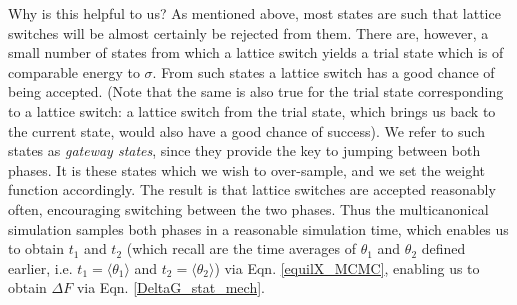 \documentclass{report}
\begin{document}
Why is this helpful to us? As mentioned above, most states are such that lattice switches will be almost certainly be rejected from them. There 
are, however, a small number of states from which a lattice switch yields a trial state which is of comparable energy to $\sigma$. From such 
states a lattice switch has a good chance of being accepted. (Note that the same is also true for the trial state corresponding to a lattice switch:
a lattice switch from the trial state, which brings us back to the current state, would also have a good chance of success). We refer to 
such states as \emph{gateway states}, since they provide the key to jumping between both phases. It is these states which we wish to over-sample,
and we set the weight function accordingly. The result is that lattice switches are accepted reasonably often, encouraging switching between the 
two phases. Thus the multicanonical simulation samples both phases in a reasonable simulation time, which enables us to obtain 
$t_1$ and $t_2$ (which recall are the time averages of $\theta_1$ and $\theta_2$ defined earlier, i.e. $t_1=\langle\theta_1\rangle$ and 
$t_2=\langle\theta_2\rangle$) via Eqn. \eqref{equilX_MCMC}, enabling us to obtain $\Delta F$ via Eqn. \eqref{DeltaG_stat_mech}.
\end{document}
